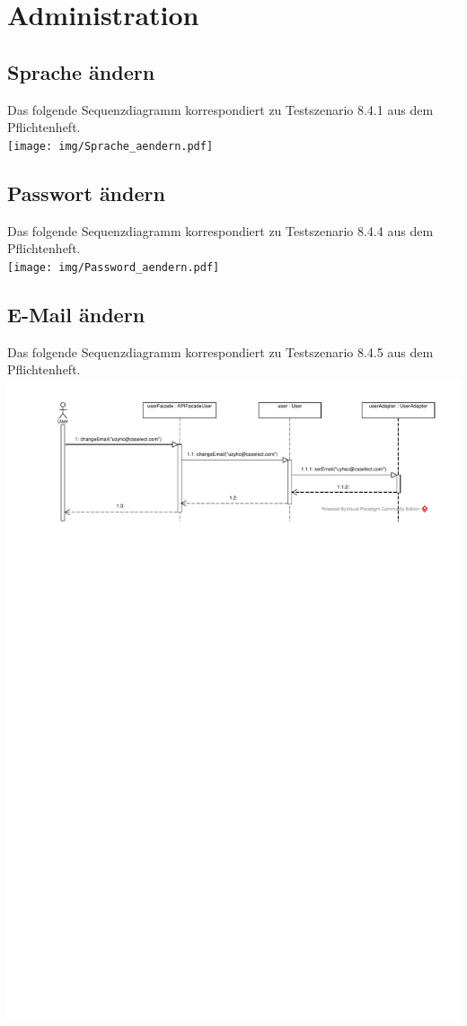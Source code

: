 \documentclass[a4paper]{scrreprt}
\begin{document}
	\section{Administration}
	\subsection{Sprache ändern}
	Das folgende Sequenzdiagramm korrespondiert zu Testszenario 8.4.1 aus dem Pflichtenheft. \\
	\texttt{[image: img/Sprache\_aendern.pdf]}

	\subsection{Passwort ändern}
	Das folgende Sequenzdiagramm korrespondiert zu Testszenario 8.4.4 aus dem Pflichtenheft. \\
	\texttt{[image: img/Password\_aendern.pdf]}

	\subsection{E-Mail ändern}
	Das folgende Sequenzdiagramm korrespondiert zu Testszenario 8.4.5 aus dem Pflichtenheft. \\
	\includegraphics[width=\textwidth]{img/Email_aendern.pdf}
\end{document}
